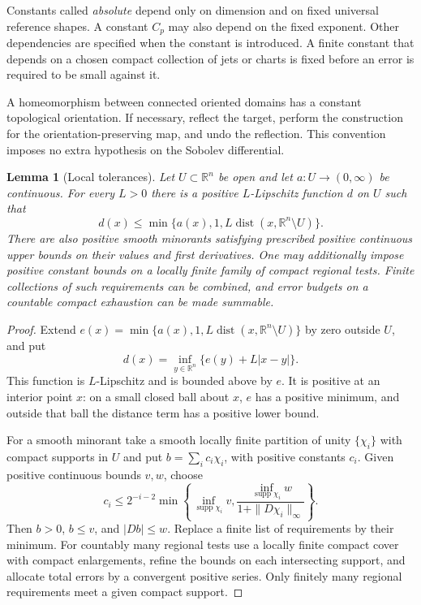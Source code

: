 \documentclass[11pt]{article}
\numberwithin{equation}{section}
\newtheorem{lemma}[theorem]{Lemma}
\theoremstyle{definition}
\theoremstyle{remark}
\begin{document}
Constants called \emph{absolute} depend only on dimension and on fixed universal reference shapes. A constant $C_p$ may also depend on the fixed exponent. Other dependencies are specified when the constant is introduced. A finite constant that depends on a chosen compact collection of jets or charts is fixed before an error is required to be small against it.

A homeomorphism between connected oriented domains has a constant topological orientation. If necessary, reflect the target, perform the construction for the orientation-preserving map, and undo the reflection. This convention imposes no extra hypothesis on the Sobolev differential.

\begin{lemma}[Local tolerances]\label{pre:local-tolerances}
Let $U\subset\mathbb R^n$ be open and let $a:U\to(0,\infty)$ be continuous. For every $L>0$ there is a positive $L$-Lipschitz function $d$ on $U$ such that
\[
 d(x)\le \min\{a(x),1,L\operatorname{dist}(x,\mathbb R^n\setminus U)\}.
\]
There are also positive smooth minorants satisfying prescribed positive continuous upper bounds on their values and first derivatives. One may additionally impose positive constant bounds on a locally finite family of compact regional tests. Finite collections of such requirements can be combined, and error budgets on a countable compact exhaustion can be made summable.
\end{lemma}
\begin{proof}
Extend $e(x)=\min\{a(x),1,L\operatorname{dist}(x,\mathbb R^n\setminus U)\}$ by zero outside $U$, and put
\[
 d(x)=\inf_{y\in\mathbb R^n}\{e(y)+L|x-y|\}.
\]
This function is $L$-Lipschitz and is bounded above by $e$. It is positive at an interior point $x$: on a small closed ball about $x$, $e$ has a positive minimum, and outside that ball the distance term has a positive lower bound.

For a smooth minorant take a smooth locally finite partition of unity $\{\chi_i\}$ with compact supports in $U$ and put $b=\sum_i c_i\chi_i$, with positive constants $c_i$. Given positive continuous bounds $v,w$, choose
\[
 c_i\le 2^{-i-2}\min\left\{
 \inf_{\operatorname{supp}\chi_i}v,
 \frac{\inf_{\operatorname{supp}\chi_i}w}{1+\|D\chi_i\|_\infty}
 \right\}.
\]
Then $b>0$, $b\le v$, and $|Db|\le w$. Replace a finite list of requirements by their minimum. For countably many regional tests use a locally finite compact cover with compact enlargements, refine the bounds on each intersecting support, and allocate total errors by a convergent positive series. Only finitely many regional requirements meet a given compact support.
\end{proof}
\end{document}
